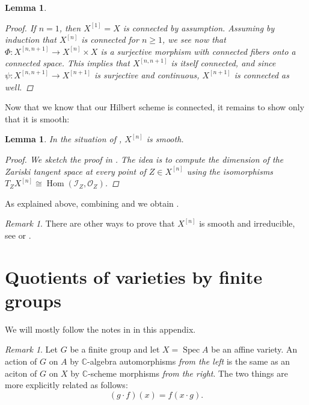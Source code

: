 \documentclass[12pt,a4paper]{amsart}
\theoremstyle{plain}
\newtheorem{lm}[thm]{Lemma}
\theoremstyle{definition}
\theoremstyle{remark}
\newtheorem{rem}[thm]{Remark}
\begin{document}
\begin{lm}
\begin{proof}
    If $n = 1$, then $X^{[1]} = X$ is connected by assumption.
    Assuming by induction that $X^{[n]}$ is connected for $n \geq 1$, we see now that $\Phi \colon X^{[n, n+1]} \to X^{[n]} \times X$ is a surjective morphism with connected fibers onto a connected space.
    This implies that $X^{[n, n+1]}$ is itself connected, and since $\psi \colon X^{[n,n+1]} \to X^{[n+1]}$ is surjective and continuous, $X^{[n+1]}$ is connected as well.
  \end{proof}
\end{lm}

Now that we know that our Hilbert scheme is connected, it remains to show only that it is smooth:

\begin{lm}\label{lm:smoothness}
  In the situation of , $X^{[n]}$ is smooth.

  \begin{proof}
    We sketch the proof in \cite[Example 4.5.10]{hl97}.
    The idea is to compute the dimension of the Zariski tangent space at every point of $Z \in X^{[n]}$ using the isomorphisms $T_{Z}X^{[n]} \cong \operatorname{Hom}(\mathscr{I}_{Z}, \mathscr{O}_{Z})$.
  \end{proof}
\end{lm}

As explained above, combining  and  we obtain .

\begin{rem}
  There are other ways to prove that $X^{[n]}$ is smooth and irreducible, see \cite[Theorem 1.15]{nak99} or \cite[Theorem 18.7]{ms05}.
\end{rem}

\appendix

\section{Quotients of varieties by finite groups}\label{sec:quotient}

We will mostly follow the notes in \cite[Appendix A]{mus11} in this appendix.

\begin{rem}
  Let $G$ be a finite group and let $X = \operatorname{Spec}{A}$ be an affine variety.
  An action of $G$ on $A$ by $\mathbb{C}$-algebra automorphisms \textit{from the left} is the same as an aciton of $G$ on $X$ by $\mathbb{C}$-scheme morphisms \textit{from the right}.
  The two things are more explicitly related as follows:
  \[ (g \cdot f)(x) = f(x \cdot g). \]
\end{rem}
\end{document}

